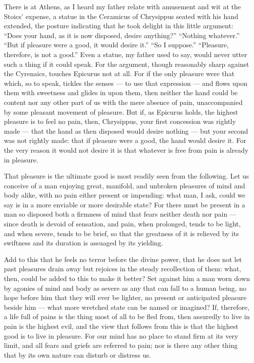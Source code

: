  There is at Athens, as I heard my father relate with amusement and wit at the Stoics' expense, a statue in the Ceramicus of Chrysippus seated with his hand extended, the posture indicating that he took delight in this little argument: ``Does your hand, as it is now disposed, desire anything?'' ``Nothing whatever.'' ``But if pleasure were a good, it would desire it.'' ``So I suppose.'' ``Pleasure, therefore, is not a good.'' Even a statue, my father used to say, would never utter such a thing if it could speak. For the argument, though reasonably sharp against the Cyrenaics, touches Epicurus not at all. For if the only pleasure were that which, so to speak, tickles the senses — to use that expression — and flows upon them with sweetness and glides in upon them, then neither the hand could be content nor any other part of us with the mere absence of pain, unaccompanied by some pleasant movement of pleasure. But if, as Epicurus holds, the highest pleasure is to feel no pain, then, Chrysippus, your first concession was rightly made — that the hand as then disposed would desire nothing — but your second was not rightly made: that if pleasure were a good, the hand would desire it. For the very reason it would not desire it is that whatever is free from pain is already in pleasure.

 That pleasure is the ultimate good is most readily seen from the following. Let us conceive of a man enjoying great, manifold, and unbroken pleasures of mind and body alike, with no pain either present or impending: what man, I ask, could we say is in a more enviable or more desirable state? For there must be present in a man so disposed both a firmness of mind that fears neither death nor pain — since death is devoid of sensation, and pain, when prolonged, tends to be light, and when severe, tends to be brief, so that the greatness of it is relieved by its swiftness and its duration is assuaged by its yielding.

 Add to this that he feels no terror before the divine power, that he does not let past pleasures drain away but rejoices in the steady recollection of them: what, then, could be added to this to make it better? Set against him a man worn down by agonies of mind and body as severe as any that can fall to a human being, no hope before him that they will ever be lighter, no present or anticipated pleasure beside him — what more wretched state can be named or imagined? If, therefore, a life full of pains is the thing most of all to be fled from, then assuredly to live in pain is the highest evil, and the view that follows from this is that the highest good is to live in pleasure. For our mind has no place to stand firm at its very limit, and all fears and griefs are referred to pain; nor is there any other thing that by its own nature can disturb or distress us.

